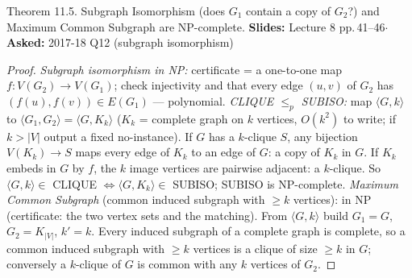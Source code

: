\documentclass[10.5pt,a4paper]{article}
\newcommand{\src}[2]{{\footnotesize\color{gray!70!black}\textbf{Slides:} #1\enspace$\cdot$\enspace\textbf{Asked:} #2}\par}
\begin{document}
\begin{thm}{Theorem 11.5. Subgraph Isomorphism (does $G_1$ contain a copy of $G_2$?) and Maximum Common Subgraph are NP-complete.}
\src{Lecture 8 pp.\,41--46}{2017-18 Q12 (subgraph isomorphism)}\end{thm}
\begin{proof}
\emph{Subgraph isomorphism in NP:} certificate = a one-to-one map $f:V(G_2)\to V(G_1)$; check injectivity and that every edge $(u,v)$ of $G_2$
has $(f(u),f(v))\in E(G_1)$ --- polynomial.
\emph{CLIQUE $\le_p$ SUBISO:} map $\langle G,k\rangle$ to $\langle G_1,G_2\rangle=\langle G,K_k\rangle$ ($K_k$ = complete graph on $k$ vertices,
$O(k^2)$ to write; if $k>|V|$ output a fixed no-instance). If $G$ has a $k$-clique $S$, any bijection $V(K_k)\to S$ maps every edge of $K_k$
to an edge of $G$: a copy of $K_k$ in $G$. If $K_k$ embeds in $G$ by $f$, the $k$ image vertices are pairwise adjacent: a $k$-clique. So
$\langle G,k\rangle\in$ CLIQUE $\iff\langle G,K_k\rangle\in$ SUBISO; SUBISO is NP-complete.
\emph{Maximum Common Subgraph} (common induced subgraph with $\ge k$ vertices): in NP (certificate: the two vertex sets and the matching).
From $\langle G,k\rangle$ build $G_1=G$, $G_2=K_{|V|}$, $k'=k$. Every induced subgraph of a complete graph is complete, so a common induced
subgraph with $\ge k$ vertices is a clique of size $\ge k$ in $G$; conversely a $k$-clique of $G$ is common with any $k$ vertices of $G_2$.
\end{proof}
\end{document}
